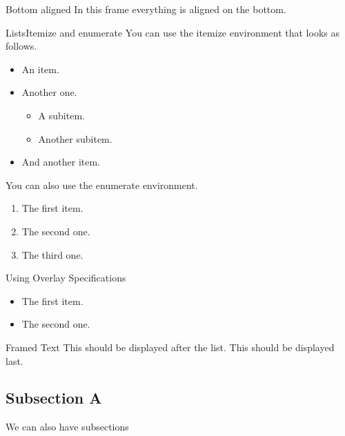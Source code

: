 \begin{frame}[b]{Bottom aligned}
In this frame everything is aligned on the bottom.
\end{frame}
%
%
%
%
%
\begin{frame}{Lists}{Itemize and enumerate}
You can use the itemize environment that looks as follows.
\begin{itemize}
\item An item.
\item Another one.
\begin{itemize}
\item A subitem.
\item Another subitem.
\end{itemize}
\item And another item.
\end{itemize}
%
\vfill%
You can also use the enumerate environment.
\begin{enumerate}
\item The first item.
\item The second one.
\item The third one.
\end{enumerate}
\end{frame}

\begin{frame}{Using Overlay Specifications}
\begin{itemize}[<+(1)->]
\item The first item.
\item The second one.
\end{itemize}
\pause
\begin{block}{Framed Text}
This should be displayed after the list.
\pause
This should be displayed last.
\end{block}
\end{frame}
%
%
%
%
%
\subsection{Subsection A}
\begin{frame}{\mbox{}}
We can also have subsections
\end{frame}
%
%
%
%
%
